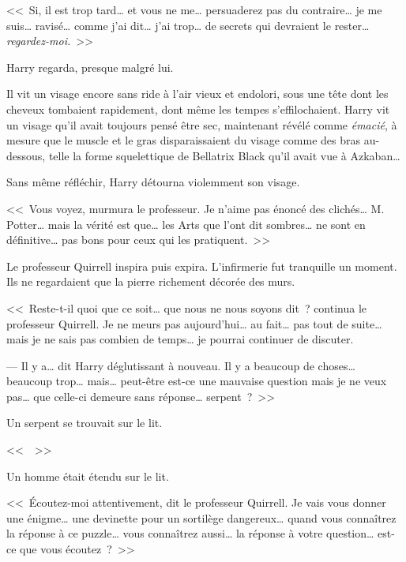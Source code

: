<<~Si, il est trop tard… et vous ne me… persuaderez pas du contraire… je me suis… ravisé… comme j'ai dit… j'ai trop… de secrets qui devraient le rester… \emph{regardez-moi.}~>>

Harry regarda, presque malgré lui.

Il vit un visage encore sans ride à l'air vieux et endolori, sous une tête dont les cheveux tombaient rapidement, dont même les tempes s'effilochaient. Harry vit un visage qu'il avait toujours pensé être sec, maintenant révélé comme \emph{émacié}, à mesure que le muscle et le gras disparaissaient du visage comme des bras au-dessous, telle la forme squelettique de Bellatrix Black qu'il avait vue à Azkaban…

Sans même réfléchir, Harry détourna violemment son visage.

<<~Vous voyez, murmura le professeur. Je n'aime pas énoncé des clichés… M. Potter… mais la vérité est que… les Arts que l'ont dit sombres… ne sont en définitive… pas bons pour ceux qui les pratiquent.~>>

Le professeur Quirrell inspira puis expira. L'infirmerie fut tranquille un moment. Ils ne regardaient que la pierre richement décorée des murs.

<<~Reste-t-il quoi que ce soit… que nous ne nous soyons dit~? continua le professeur Quirrell. Je ne meurs pas aujourd'hui… au fait… pas tout de suite… mais je ne sais pas combien de temps… je pourrai continuer de discuter.

--- Il y a… dit Harry déglutissant à nouveau. Il y a beaucoup de choses… beaucoup trop… mais… peut-être est-ce une mauvaise question mais je ne veux pas… que celle-ci demeure sans réponse… serpent~?~>>

Un serpent se trouvait sur le lit.

<<~~>>

Un homme était étendu sur le lit.

<<~Écoutez-moi attentivement, dit le professeur Quirrell. Je vais vous donner une énigme… une devinette pour un sortilège dangereux… quand vous connaîtrez la réponse à ce puzzle… vous connaîtrez aussi… la réponse à votre question… est-ce que vous écoutez~?~>>

